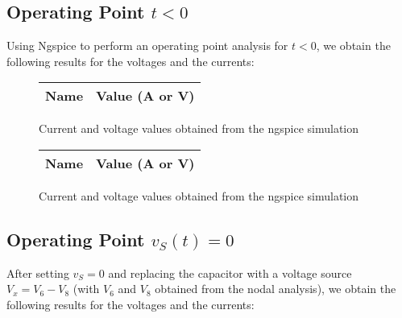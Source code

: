 \label{simulation}
\subsection{Operating Point $t < 0$}
\hspace{12pt} Using Ngspice to perform an operating point analysis for $t < 0$, we obtain the following results for the voltages and the currents:
\begin{figure}[h]
	\begin{minipage}{.45\textwidth}
		\begin{center}
			\begin{tabular}{|c|c|}
				\hline
				\textbf{Name} & \textbf{Value (A or V)} \\
				\hline
				
			\end{tabular}
		\end{center}
		\caption{Current and voltage values obtained from the ngspice simulation}
		\label{op1_results}
	\end{minipage}
	\begin{minipage}{.45\textwidth}
		\begin{center}
			\begin{tabular}{|c|c|}
				\hline
				\textbf{Name} & \textbf{Value (A or V)} \\
				\hline
				
			\end{tabular}
		\end{center}
		\caption{Current and voltage values obtained from the ngspice simulation}
		\label{op2_results}
	\end{minipage}
\end{figure}
\fontsize{11}{12}\selectfont


\subsection{Operating Point $v_S(t) = 0$}
\hspace{12pt} After setting $v_S = 0$ and replacing the capacitor with a voltage source $V_x = V_6 - V_8$ (with $V_6$ and $V_8$ obtained from the nodal analysis), we obtain the following results for the voltages and the currents: 

